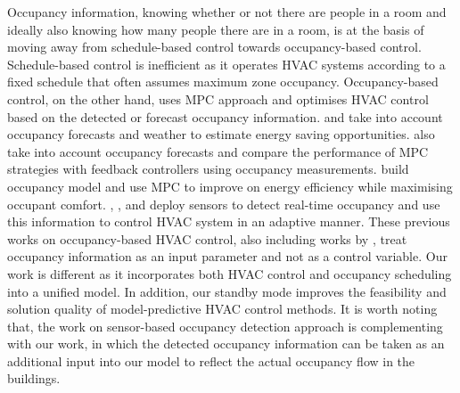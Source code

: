 Occupancy information, knowing whether or not there are people in a room and ideally also knowing how many people there are in a room, is at the basis of moving away from schedule-based control towards occupancy-based control. Schedule-based control is inefficient as it operates HVAC systems according to a fixed schedule that often assumes maximum zone occupancy. Occupancy-based control, on the other hand, uses MPC approach and optimises HVAC control based on the detected or forecast occupancy information. \cite{klein2012coordinating} and \cite{oldewurtel2012use} take into account occupancy forecasts and weather to estimate energy saving opportunities. \cite{goyal2013occupancy} also take into account occupancy forecasts and compare the performance of MPC strategies with feedback controllers using occupancy measurements. \cite{mady2011stochastic} build occupancy model and use MPC to improve on energy efficiency while maximising occupant comfort. \cite{mamidi2012adaptive}, \cite{li2012measuring}, \cite{erickson2009energy} and \cite{agarwal2010occupancy} deploy sensors to detect real-time occupancy and use this information to control HVAC system in an adaptive manner. These previous works on occupancy-based HVAC control, also including works by \cite{brooks2015energy,mady2011stochastic,parisio2013randomized,xu2009model}, treat occupancy information as an input parameter and not as a control variable. Our work is different as it incorporates both HVAC control and occupancy scheduling into a unified model. In addition, our standby mode improves the feasibility and solution quality of model-predictive HVAC control methods. It is worth noting that, the work on sensor-based occupancy detection approach is complementing with our work, in which the detected occupancy information can be taken as an additional input into our model to reflect the actual occupancy flow in the buildings. 


